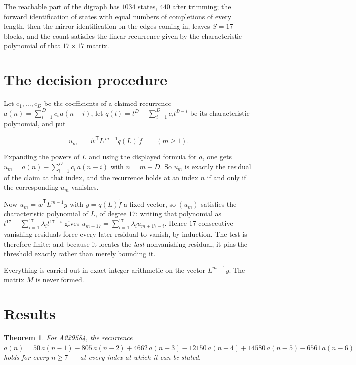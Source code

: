\documentclass[11pt]{article}
\newtheorem{theorem}{Theorem}
\theoremstyle{definition}
\begin{document}
The reachable part of the digraph has $1034$ states, $440$ after trimming; the forward identification of states with equal numbers of completions of every length, then the mirror identification on the edges coming in, leaves $S = 17$ blocks, and the count satisfies the linear recurrence given by the characteristic polynomial of that $17\times17$ matrix.

\section{The decision procedure}

Let $c_1,\dots,c_D$ be the coefficients of a claimed recurrence $a(n) = \sum_{i=1}^{D} c_i\,a(n-i)$, let $q(t) = t^{D} - \sum_{i=1}^{D} c_i t^{D-i}$ be its characteristic polynomial, and put

\[u_m \;=\; \tilde w^{\mathsf T} L^{\,m-1} q(L)\,\tilde f \qquad (m \ge 1).\]

Expanding the powers of $L$ and using the displayed formula for $a$, one gets $u_m = a(n) - \sum_{i=1}^{D} c_i\,a(n-i)$ with $n = m + D$. So $u_m$ is exactly the residual of the claim at that index, and the recurrence holds at an index $n$ if and only if the corresponding $u_m$ vanishes.

Now $u_m = \tilde w^{\mathsf T} L^{m-1} y$ with $y = q(L)\tilde f$ a fixed vector, so $(u_m)$ satisfies the characteristic polynomial of $L$, of degree $17$: writing that polynomial as $t^{17} - \sum_{i=1}^{17} \lambda_i t^{17-i}$ gives $u_{m+17} = \sum_{i=1}^{17} \lambda_i u_{m+17-i}$. Hence $17$ consecutive vanishing residuals force every later residual to vanish, by induction. The test is therefore finite; and because it locates the {\itshape last} nonvanishing residual, it pins the threshold exactly rather than merely bounding it.

Everything is carried out in exact integer arithmetic on the vector $L^{m-1}y$. The matrix $M$ is never formed.

\section{Results}

\begin{theorem} For A229584, the recurrence $a(n) = 50\,a(n-1) - 805\,a(n-2) + 4662\,a(n-3) - 12150\,a(n-4) + 14580\,a(n-5) - 6561\,a(n-6)$ holds for every $n \ge 7$ --- at every index at which it can be stated.\end{theorem}
\end{document}
